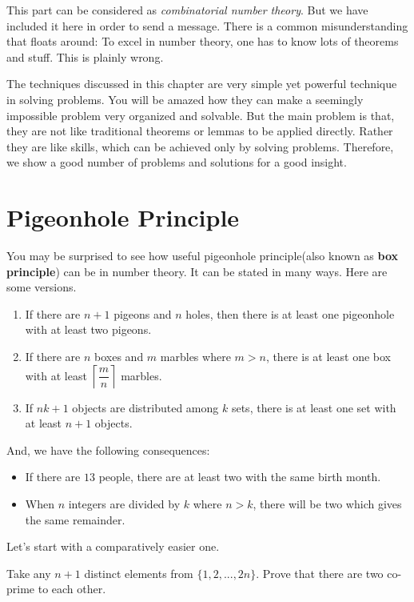 \documentclass[nt_billal_v1.tex]{subfile}
\begin{document}
This part can be considered as \textit{combinatorial number theory}. But we have included it here in order to send a message. There is a common misunderstanding that floats around: To excel in number theory, one has to know lots of theorems and stuff. This is plainly wrong. 

The techniques discussed in this chapter are very simple yet powerful technique in solving problems. You will be amazed how they can make a seemingly impossible problem very organized and solvable. But the main problem is that, they are not like traditional theorems or lemmas to be applied directly. Rather they are like skills, which can be achieved only by solving problems. Therefore, we show a good number of problems and solutions for a good insight.



\section{Pigeonhole Principle}
You may be surprised to see how useful pigeonhole principle(also known as \textbf{box principle}) can be in number theory. It can be stated in many ways. Here are some versions.

\begin{enumerate}[i]
	\item If there are $n+1$ pigeons and $n$ holes, then there is at least one pigeonhole with at least two pigeons.
	\item If there are $n$ boxes and $m$ marbles where $m>n$, there is at least one box with at least $\left\lceil\dfrac{m}{n}\right\rceil$ marbles.
	\item If $nk+1$ objects are distributed among $k$ sets, there is at least one set with at least $n+1$ objects.
\end{enumerate}

And, we have the following consequences: %

\begin{itemize}
	\item If there are $13$ people, there are at least two with the same birth month.
	\item When $n$ integers are divided by $k$ where $n>k$, there will be two which gives the same remainder.
\end{itemize}

Let's start with a comparatively easier one.
	\begin{problem}
		Take any $n+1$ distinct elements from $\{1,2,...,2n\}$. Prove that there are two co-prime to each other.
	\end{problem}
	
\end{document}
